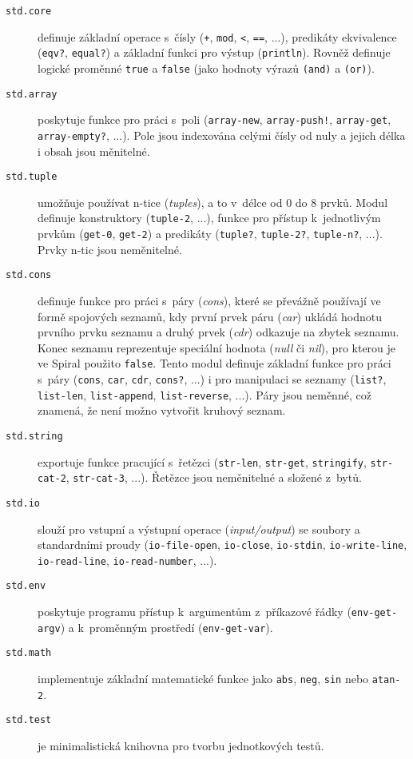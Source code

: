 \begin{description}
  \item[\texttt{std.core}] definuje základní operace s~čísly (\texttt{+},
    \texttt{mod}, \texttt{<}, \texttt{==}, ...), predikáty ekvivalence
    (\texttt{eqv?}, \texttt{equal?}) a základní funkci pro výstup
    (\texttt{println}).  Rovněž definuje logické proměnné \texttt{true} a
    \texttt{false} (jako hodnoty výrazů \texttt{(and)} a \texttt{(or)}).

  \item[\texttt{std.array}] poskytuje funkce pro práci s~poli
    (\texttt{array-new}, \texttt{array-push!}, \texttt{array-get},
    \texttt{array-empty?}, ...). Pole jsou indexována celými čísly od nuly a
    jejich délka i obsah jsou měnitelné.

  \item[\texttt{std.tuple}] umožňuje používat n-tice (\emph{tuples}), a to
    v~délce od 0 do 8 prvků. Modul definuje konstruktory (\texttt{tuple-2},
    ...), funkce pro přístup k~jednotlivým prvkům (\texttt{get-0},
    \texttt{get-2}) a predikáty (\texttt{tuple?}, \texttt{tuple-2?},
    \texttt{tuple-n?}, ...). Prvky n-tic jsou neměnitelné.

  \item[\texttt{std.cons}] definuje funkce pro práci s~páry (\emph{cons}), které
    se převážně používají ve formě spojových seznamů, kdy první prvek páru
    (\emph{car}) ukládá hodnotu prvního prvku seznamu a druhý prvek (\emph{cdr})
    odkazuje na zbytek seznamu. Konec seznamu reprezentuje speciální hodnota
    (\emph{null} či \emph{nil}), pro kterou je ve Spiral použito \texttt{false}.
    Tento modul definuje základní funkce pro práci s~páry (\texttt{cons},
    \texttt{car}, \texttt{cdr}, \texttt{cons?}, ...) i pro manipulaci se seznamy
    (\texttt{list?}, \texttt{list-len}, \texttt{list-append},
    \texttt{list-reverse}, ...). Páry jsou neměnné, což znamená, že není možno
    vytvořit kruhový seznam.

  \item[\texttt{std.string}] exportuje funkce pracující s~řetězci
    (\texttt{str-len}, \texttt{str-get}, \texttt{stringify}, \texttt{str-cat-2},
    \texttt{str-cat-3}, ...). Řetězce jsou neměnitelné a složené z~bytů.

  \item[\texttt{std.io}] slouží pro vstupní a výstupní operace
    (\emph{input/output}) se soubory a standardními proudy
    (\texttt{io-file-open}, \texttt{io-close}, \texttt{io-stdin},
    \texttt{io-write-line}, \texttt{io-read-line}, \texttt{io-read-number},
    ...).

  \item[\texttt{std.env}] poskytuje programu přístup k~argumentům z~příkazové
    řádky (\texttt{env-get-argv}) a k~proměnným prostředí (\texttt{env-get-var}).

  \item[\texttt{std.math}] implementuje základní matematické funkce jako
    \texttt{abs}, \texttt{neg}, \texttt{sin} nebo \texttt{atan-2}.

  \item[\texttt{std.test}] je minimalistická knihovna pro tvorbu jednotkových
    testů.
\end{description}
